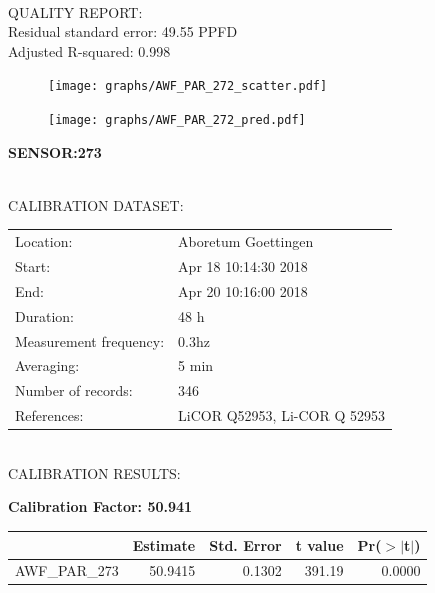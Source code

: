 \documentclass[oneside]{report}
\begin{document}
\hrulefill\\
QUALITY REPORT:\\
Residual standard error: 49.55 PPFD\\
Adjusted R-squared: 0.998



\begin{figure}[H]
  \centering
  \texttt{[image: graphs/AWF\_PAR\_272\_scatter.pdf]}
\end{figure}




\begin{figure}[H]
  \centering
  \texttt{[image: graphs/AWF\_PAR\_272\_pred.pdf]}
\end{figure}

\pagebreak


\begin{center}
\large{\textbf{SENSOR:273}}\\
\end{center}

\hrulefill\\
CALIBRATION DATASET:\\
\begin{table}[h!]
  \centering
  \label{tab:table1}
  \begin{tabular}{ll}
    Location: & Aboretum Goettingen\\ 
    
    
    Start:  & Apr 18 10:14:30 2018 \\
    End:   & Apr 20 10:16:00 2018\\ 
    Duration: & 48 h\\
    Measurement frequency: & 0.3hz\\
    Averaging:  &5 min\\
    Number of records: & 346 \\
    References: & LiCOR Q52953, Li-COR Q 52953 \\
  \end{tabular}
\end{table}

\hrulefill\\
CALIBRATION RESULTS:\\


\begin{center}
\textbf{\large{Calibration Factor: 50.941}}\\
\end{center}
\begin{table}[ht]
\centering
\begin{tabular}{rrrrr}
  \hline
 & Estimate & Std. Error & t value & Pr($>$$|$t$|$) \\ 
  \hline
AWF\_PAR\_273 & 50.9415 & 0.1302 & 391.19 & 0.0000 \\ 
   \hline
\end{tabular}
\end{table}
\end{document}
